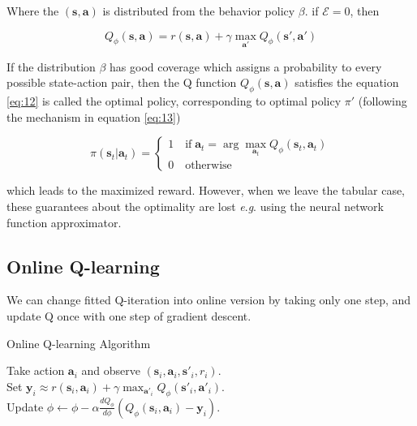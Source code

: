 \documentclass{tufte-handout}
\newcommand{\eg}{\textit{e}.\textit{g}. }
\newcommand{\s}{\mathbf{s}}
\newcommand{\act}{\mathbf{a}}
\begin{document}
Where the $(\s, \act)$ is distributed from the behavior policy $\beta$. if $\mathcal{E} = 0$, then

\begin{equation}
\label{eq:12}
Q_\phi(\s, \act)  = r(\s, \act) + \gamma \max_{\act'} Q_\phi (\s', \act')
\end{equation}

If the distribution $\beta$ has good coverage which assigns a probability to every possible state-action pair, then the Q function $Q_\phi(\s, \act)$
satisfies the equation \ref{eq:12} is called the optimal policy, corresponding to optimal policy $\pi'$ (following the mechanism in equation \ref{eq:13})

\begin{equation}
\label{eq:13}
\pi(\s_t | \act_t) =
\begin{cases}
1 \quad \text{if} \; \act_t = \arg \max_{\act_t} {Q}_\phi(\s_t, \act_t) \\
0 \quad \text{otherwise}
\end{cases}
\end{equation}

which leads to the maximized reward. However, when we leave the tabular case, these guarantees about the optimality are lost \eg using the neural network
function approximator.

\subsection{Online Q-learning}

We can change fitted Q-iteration into online version by taking only one step, and update Q once with one step of gradient descent.

\begin{algorithm}
  \caption{Online Q-learning Algorithm}
    \label{algo:online-q}
    \begin{algorithmic}[1]
    \STATE Take action $\act_i$ and observe $(\s_i, \act_i, \s'_i, r_i)$. \\
    \STATE Set $\mathbf{y}_i \approx r(\s_i, \act_i) +\gamma \max_{\act'_i} Q_\phi(\s'_i, \act'_i) $. \\
    \STATE Update $\phi \leftarrow \phi - \alpha \frac{d Q_\phi}{d \phi} (Q_\phi(\s_i, \act_i) - \mathbf{y}_i)$. \\
    \ENDWHILE
  \end{algorithmic}
\end{algorithm}
\end{document}
